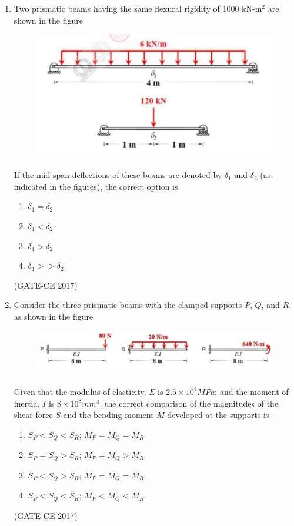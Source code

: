 \documentclass[journal,12pt,onecolumn]{article}
\theoremstyle{remark}
\begin{document}
\begin{enumerate}
    \item Two prismatic beams having the same flexural rigidity of 1000 kN-m$^2$ are shown in the figure 
    \begin{figure}[H]
    \centering
    \includegraphics[width=0.7\columnwidth]{q31.jpg}  
    \caption{}
    \label{fig:7}
    \end{figure}
    If the mid-span deflections of these beams are denoted by $\delta_1$ and $\delta_2$ (as indicated in the figures), the correct option is
    \begin{multicols}{4}
    \begin{enumerate}
        \item $\delta_1 = \delta_2$  
        \item $\delta_1 < \delta_2$  
        \item $\delta_1 > \delta_2$  
        \item $\delta_1 >> \delta_2$  
    \end{enumerate}
    \end{multicols}
    \hfill (GATE-CE 2017)

    \item Consider the three prismatic beams with the clamped supports $ P $, $ Q $, and $ R $ as shown in the figure 
    \begin{figure}[H]
    \centering
    \includegraphics[width=0.7\columnwidth]{q32.jpg}  
    \caption{}
    \label{fig:8}
    \end{figure}
    Given that the modulus of elasticity, $ E $ is $ 2.5 \times 10^4 MPa $; and the moment of inertia, $ I $ is $ 8 \times 10^8 mm^4 $, the correct comparison of the magnitudes of the shear force $ S $ and the bending moment $ M $ developed at the supports is
    \begin{enumerate}
        \item $ S_P < S_Q < S_R $;  $ M_P = M_Q = M_R $  
        \item $ S_P = S_Q > S_R $;  $ M_P = M_Q > M_R $  
        \item $ S_P < S_Q > S_R $;  $ M_P = M_Q = M_R $  
        \item $ S_P < S_Q < S_R $;  $ M_P < M_Q < M_R $  
    \end{enumerate}
    \hfill (GATE-CE 2017)


\end{enumerate}
\end{document}
